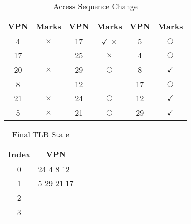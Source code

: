 \begin{parts}
    \begin{table}[ht]
        \begin{minipage}{\textwidth}
            \centering
            \caption{Access Sequence Change}
            \label{tab:TLB_access_sequence}
            \setlength{\tabcolsep}{15pt}
            \renewcommand{\arraystretch}{1.5}
            \begin{tabular}{|c|c||c|c||c|c|}
                \hline
                \textbf{VPN} & \textbf{Marks} & \textbf{VPN} & \textbf{Marks}        & \textbf{VPN} & \textbf{Marks} \\
                \hline
                4            & $\times$       & 17           & $\checkmark$ $\times$ & 5            & $\bigcirc$     \\
                \hline
                17           &                & 25           & $\times$              & 4            & $\bigcirc$     \\
                \hline
                20           & $\times$       & 29           & $\bigcirc$            & 8            & $\checkmark$   \\
                \hline
                8            &                & 12           &                       & 17           & $\bigcirc$     \\
                \hline
                21           & $\times$       & 24           & $\bigcirc$            & 12           & $\checkmark$   \\
                \hline
                5            & $\times$       & 21           & $\bigcirc$            & 29           & $\checkmark$   \\
                \hline
            \end{tabular}
        \end{minipage}
    \end{table}

    \begin{table}[ht]
        \centering
        \caption{Final TLB State}
        \label{tab:tlb_state_2}
        \renewcommand{\arraystretch}{1.5}
        \begin{tabular}{|c|p{5cm}|} %
            \hline %
            \multicolumn{1}{|c|}{\textbf{Index}} & \multicolumn{1}{c|}{\textbf{VPN}} \\
            \hline
            0                                    & 24 4 8 12                         \\ \hline
            1                                    & 5 29 21 17                        \\ \hline
            2                                    &                                   \\ \hline
            3                                    &                                   \\ \hline
        \end{tabular}
    \end{table}


\end{parts}